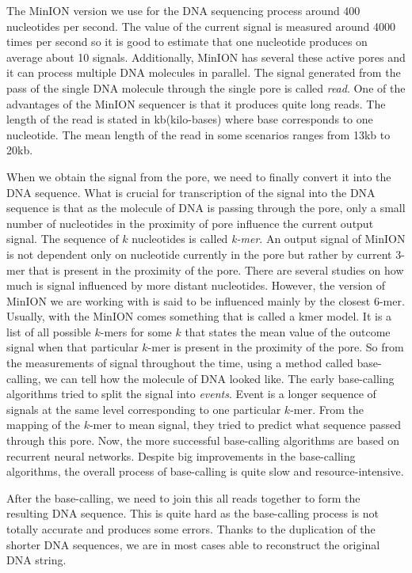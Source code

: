 The MinION version we use for the DNA sequencing process around 400 nucleotides per second.
The value of the current signal is measured around 4000 times per second so it is good to
estimate that one nucleotide produces on average about 10 signals. Additionally,
MinION has several these active pores and it can process multiple DNA molecules in
parallel. The signal generated from the pass of the single DNA molecule through
the single pore is called \textit{read}. One of the advantages of the MinION sequencer is
that it produces quite long reads. The length of the read is stated in kb(kilo-bases)
where base corresponds to one nucleotide. The mean length of the read in some
scenarios ranges from 13kb to 20kb.


When we obtain the signal from the pore, we need to finally convert it into the DNA
sequence. What is crucial for transcription of the signal into the DNA sequence is
that as the molecule of DNA is passing through the pore, only a small
number of nucleotides in the proximity of pore influence the current output signal.
The sequence of $k$ nucleotides is called \textit{k-mer}. An output signal of MinION
is not dependent only on nucleotide currently in the pore but rather by current
3-mer that is present in the proximity of the pore. There are several studies on
how much is signal influenced by more distant nucleotides. However, the version
of MinION we are working with is said to be influenced mainly by the closest 6-mer. 
Usually, with the MinION comes something that is called a kmer model. It is a list of all possible $k$-mers
for some $k$ that states the mean value of the outcome signal when that particular
$k$-mer is present in the proximity of the pore. So from the measurements of signal
throughout the time, using a method called base-calling, we can tell how the molecule
of DNA looked like. The early base-calling algorithms tried to split the signal into
\textit{events}. Event is a longer sequence of signals at the same level corresponding
to one particular $k$-mer. From the mapping of the $k$-mer to mean signal, they tried
to predict what sequence passed through this pore. Now, the more successful base-calling
algorithms are based on recurrent neural networks. Despite big improvements in the
base-calling algorithms, the overall process of base-calling is quite slow and resource-intensive. 

After the base-calling, we need to join this all reads together to form the
resulting DNA sequence. This is quite hard as the base-calling process is not totally
accurate and produces some errors. Thanks to the duplication of the shorter DNA
sequences, we are in most cases able to reconstruct the original DNA string.

